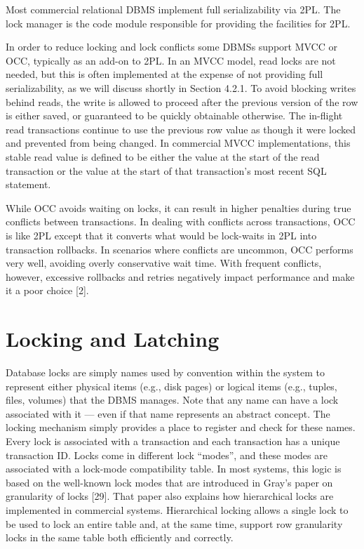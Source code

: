 \documentclass[a4paper,11pt,twoside,openright]{book}
\begin{document}
Most commercial relational DBMS implement full serializability via 2PL.
The lock manager is the code module responsible for providing the
facilities for 2PL.

In order to reduce locking and lock conflicts some DBMSs support MVCC
or OCC, typically as an add-on to 2PL. In an MVCC model, read locks are
not needed, but this is often implemented at the expense of not
providing full serializability, as we will discuss shortly in Section
4.2.1. To avoid blocking writes behind reads, the write is allowed to
proceed after the previous version of the row is either saved, or
guaranteed to be quickly obtainable otherwise. The in-flight read
transactions continue to use the previous row value as though it were
locked and prevented from being changed. In commercial MVCC
implementations, this stable read value is defined to be either the
value at the start of the read transaction or the value at the start of
that transaction's most recent SQL statement.

While OCC avoids waiting on locks, it can result in higher penalties
during true conflicts between transactions. In dealing with conflicts
across transactions, OCC is like 2PL except that it converts what would
be lock-waits in 2PL into transaction rollbacks. In scenarios where
conflicts are uncommon, OCC performs very well, avoiding overly
conservative wait time. With frequent conflicts, however, excessive
rollbacks and retries negatively impact performance and make it a poor
choice {[}2{]}.

\hypertarget{locking-and-latching}{%
\section{Locking and Latching}\label{locking-and-latching}}

Database locks are simply names used by convention within the system to
represent either physical items (e.g., disk pages) or logical items
(e.g., tuples, files, volumes) that the DBMS manages. Note that any name
can have a lock associated with it --- even if that name represents an
abstract concept. The locking mechanism simply provides a place to
register and check for these names. Every lock is associated with a
transaction and each transaction has a unique transaction ID. Locks come
in different lock ``modes'', and these modes are associated with a
lock-mode compatibility table. In most systems, this logic is based on
the well-known lock modes that are introduced in Gray's paper on
granularity of locks {[}29{]}. That paper also explains how hierarchical
locks are implemented in commercial systems. Hierarchical locking allows
a single lock to be used to lock an entire table and, at the same time,
support row granularity locks in the same table both efficiently and
correctly.
\end{document}
